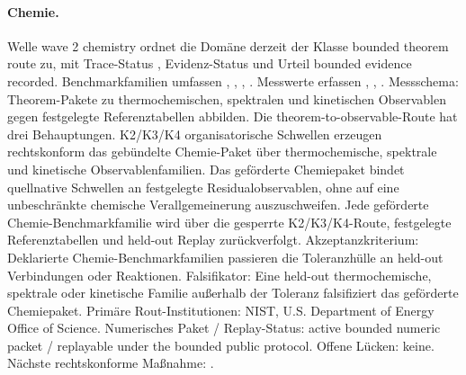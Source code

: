 \paragraph{Chemie.}
Welle wave 2 chemistry ordnet die Domäne derzeit der Klasse bounded theorem route zu, mit Trace-Status , Evidenz-Status  und Urteil bounded evidence recorded.
Benchmarkfamilien umfassen , \allowbreak {}, \allowbreak {}, \allowbreak {}.
Messwerte erfassen , \allowbreak {}, \allowbreak {}.
Messschema: Theorem-Pakete zu thermochemischen, spektralen und kinetischen Observablen gegen festgelegte Referenztabellen abbilden.
Die theorem-to-observable-Route hat drei Behauptungen. K2/K3/K4 organisatorische Schwellen erzeugen rechtskonform das gebündelte Chemie-Paket über thermochemische, spektrale und kinetische Observablenfamilien. Das geförderte Chemiepaket bindet quellnative Schwellen an festgelegte Residualobservablen, ohne auf eine unbeschränkte chemische Verallgemeinerung auszuschweifen. Jede geförderte Chemie-Benchmarkfamilie wird über die gesperrte K2/K3/K4-Route, festgelegte Referenztabellen und held-out Replay zurückverfolgt.
Akzeptanzkriterium: Deklarierte Chemie-Benchmarkfamilien passieren die Toleranzhülle an held-out Verbindungen oder Reaktionen.
Falsifikator: Eine held-out thermochemische, spektrale oder kinetische Familie außerhalb der Toleranz falsifiziert das geförderte Chemiepaket.
Primäre Rout-Institutionen: NIST, \allowbreak U.S. Department of Energy Office of Science.
Numerisches Paket / Replay-Status: active bounded numeric packet / replayable under the bounded public protocol.
Offene Lücken: keine.
Nächste rechtskonforme Maßnahme: .

